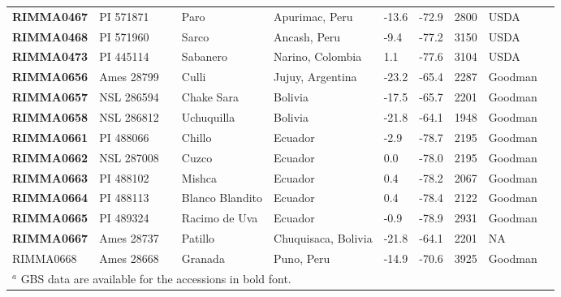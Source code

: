 \begin{table}[h]
\begin{center}
{\begin{tabular}{llllllllll}
{\bf RIMMA0467}	&	PI 571871	&		&	Paro	&	Apurimac, Peru	&	-13.6 	&	-72.9 	&	2800	&	USDA	\\
{\bf RIMMA0468}	&	PI 571960	&		&	Sarco	&	Ancash, Peru	&	-9.4 	&	-77.2 	&	3150	&	USDA	\\
{\bf RIMMA0473}	&	PI 445114	&		&	Sabanero	&	Narino, Colombia	&	1.1 	&	-77.6 	&	3104	&	USDA	\\
{\bf RIMMA0656}	&	Ames 28799	&		&	Culli	&	Jujuy, Argentina	&	-23.2 	&	-65.4 	&	2287	&	Goodman	\\
{\bf RIMMA0657}	&	NSL 286594	&		&	Chake Sara	&	Bolivia	&	-17.5 	&	-65.7 	&	2201	&	Goodman	\\
{\bf RIMMA0658}	&	NSL 286812	&		&	Uchuquilla	&	Bolivia	&	-21.8 	&	-64.1 	&	1948	&	Goodman	\\
{\bf RIMMA0661}	&	PI 488066	&		&	Chillo	&	Ecuador	&	-2.9 	&	-78.7 	&	2195	&	Goodman	\\
{\bf RIMMA0662}	&	NSL 287008	&		&	Cuzco	&	Ecuador	&	0.0 	&	-78.0 	&	2195	&	Goodman	\\
{\bf RIMMA0663}	&	PI 488102	&		&	Mishca	&	Ecuador	&	0.4 	&	-78.2 	&	2067	&	Goodman	\\
{\bf RIMMA0664}	&	PI 488113	&		&	Blanco Blandito	&	Ecuador	&	0.4 	&	-78.4 	&	2122	&	Goodman	\\
{\bf RIMMA0665}	&	PI 489324	&		&	Racimo de Uva	&	Ecuador	&	-0.9 	&	-78.9 	&	2931	&	Goodman	\\
{\bf RIMMA0667}	&	Ames 28737	&		&	Patillo	&	Chuquisaca, Bolivia	&	-21.8 	&	-64.1 	&	2201	&	NA	\\
RIMMA0668	&	Ames 28668	&		&	Granada	&	Puno, Peru	&	-14.9 	&	-70.6 	&	3925	&	Goodman	\\[-0.1mm] 
	\hline\hline
	\multicolumn{9}{l}{$^a$ GBS data are available for the accessions in bold font.}\\
    \end{tabular}}
    \label{srkid}

\end{center} 

\end{table}

\clearpage




